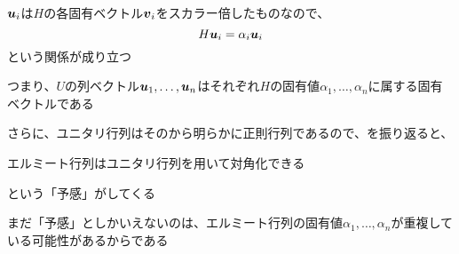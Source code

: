 \documentclass[../../../topic_linear-algebra]{subfiles}
\begin{document}
\br

$\vb*{u}_i$は$H$の各固有ベクトル$\vb*{v}_i$をスカラー倍したものなので、
\begin{equation*}
  H\vb*{u}_i = \alpha_i \vb*{u}_i
\end{equation*}
という関係が成り立つ

つまり、$U$の列ベクトル$\vb*{u}_1, \ldots, \vb*{u}_n$はそれぞれ$H$の固有値$\alpha_1, \ldots, \alpha_n$に属する固有ベクトルである

\br

さらに、ユニタリ行列はそのから明らかに正則行列であるので、を振り返ると、
\begin{shaded}
  エルミート行列はユニタリ行列を用いて対角化できる
\end{shaded}
という「予感」がしてくる

\br

まだ「予感」としかいえないのは、エルミート行列の固有値$\alpha_1, \ldots, \alpha_n$が重複している可能性があるからである
\end{document}

